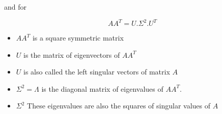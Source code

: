 \documentclass{article}
\begin{document}
\begin{tcolorbox}[colback=blue!5!white,colframe=blue!75!black,title=Singular Value Decomposition $\Longleftrightarrow $ Eigenvalue Decomposition]
	and for

	$$
	  AA^{T}=U.\Sigma^{2}.U^{T}
	$$
	
	\begin{itemize}
		\item $AA^{T}$ is a square symmetric matrix
		\item $U$ is the matrix of eigenvectors of $AA^{T}$
		\item $U$ is also called the left singular vectors of matrix $A$
		\item $\Sigma^{2}=\Lambda$ is the diagonal matrix of eigenvalues of $AA^{T}$.
		\item $\Sigma^{2}$ These eigenvalues are also the squares of singular values of $A$
	\end{itemize}
  \end{tcolorbox}
\end{document}
